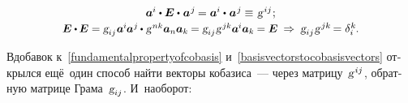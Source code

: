 \begin{otherlanguage}{russian}
\begin{equation}
\begin{array}{c}
\bm{a}^{\hspace{-0.05ex}i} \dotp \bm{E} \dotp \hspace{0.1ex} \bm{a}^{\hspace{0.1ex}j} \hspace{-0.15ex} = \bm{a}^{\hspace{-0.05ex}i} \dotp \hspace{0.1ex} \bm{a}^{\hspace{0.1ex}j} \hspace{-0.15ex} \hspace{0.1ex} \equiv \hspace{0.16ex} \textsl{g}^{\hspace{0.2ex}ij} \hspace{0.1ex} ; \\[0.2em]
%
\scalebox{0.96}[0.97]{$\bm{E} \dotp \hspace{-0.1ex} \bm{E} = \textsl{g}_{ij} \hspace{0.1ex} \bm{a}^{\hspace{-0.05ex}i} \hspace{-0.1ex} \bm{a}^{\hspace{0.05ex}j} \hspace{-0.1ex} \dotp \hspace{0.1ex} \textsl{g}^{\hspace{0.2ex}nk} \bm{a}_n \bm{a}_k \hspace{-0.1ex} = \textsl{g}_{ij} \hspace{0.1ex} \textsl{g}^{\hspace{0.2ex}jk} \bm{a}^{\hspace{-0.05ex}i} \bm{a}_k \hspace{-0.1ex} = \bm{E}$}
\:\Rightarrow\: \textsl{g}_{ij} \hspace{0.1ex} \textsl{g}^{\hspace{0.2ex}jk} \hspace{-0.25ex} = \delta_i^{\hspace{0.05ex}k} \hspace{-0.1ex}.
\end{array}\end{equation}

\vspace{0.1em}\noindent Вдобавок к~\eqref{fundamentalpropertyofcobasis} и~\eqref{basisvectorstocobasisvectors} открылся ещё~один способ найти векторы кобазиса~--- через матрицу~\hbox{$\textsl{g}^{\hspace{.2ex}ij}$\hspace{-0.3ex}}, обратную матрице Грама~${\textsl{g}_{ij}}$. И~наоборот:


\end{otherlanguage}
